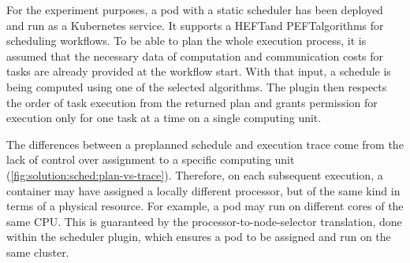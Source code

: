 

For the experiment purposes, a pod with a static scheduler has been deployed and run as a Kubernetes service.
It supports a HEFT\footnotemark[3] and PEFT\footnotemark[4] algorithms for scheduling workflows.
To be able to plan the whole execution process, it is assumed that the necessary data of computation and communication costs for tasks are already provided at the workflow start.
With that input, a schedule is being computed using one of the selected algorithms.
The plugin then respects the order of task execution from the returned plan and grants permission for execution only for one task at a time on a single computing unit.








The differences between a preplanned schedule and execution trace come from the lack of control over assignment to a specific computing unit (\cref{fig:solution:sched:plan-vs-trace}).
Therefore, on each subsequent execution, a container may have assigned a locally different processor, but of the same kind in terms of a physical resource.
For example, a pod may run on different cores of the same CPU.
This is guaranteed by the processor-to-node-selector translation, done within the scheduler plugin, which ensures a pod to be assigned and run on the same cluster.

